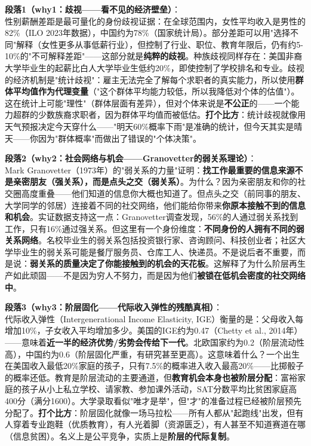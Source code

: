 \documentclass[../main.tex]{subfiles}
\begin{document}
	\textbf{段落1（why1：歧视——看不见的经济壁垒）}：\\
	性别薪酬差距是最可量化的身份歧视证据：在全球范围内，女性平均收入是男性的82\%（ILO 2023年数据），中国约为78\%（国家统计局）。部分差距可以用"选择不同"解释（女性更多从事低薪行业），但控制了行业、职位、教育年限后，仍有约5-10\%的"不可解释差距"——这部分就是\textbf{纯粹的歧视}。种族歧视同样存在：美国非裔大学毕业生的起薪比白人大学毕业生低约20\%，即使控制了学校排名和专业。歧视的经济机制是"统计歧视"：雇主无法完全了解每个求职者的真实能力，所以使用\textbf{群体平均值作为代理变量}（"这个群体平均能力较低，所以我降低对个体的估值"）。这在统计上可能"理性"（群体层面有差异），但对个体来说是\textbf{不公正}的——一个能力超群的少数族裔求职者，因为群体平均值而被低估。\textbf{打个比方}：统计歧视就像用天气预报决定今天穿什么——"明天60\%概率下雨"是准确的统计，但今天其实是晴天——你因为"群体概率"而做出了错误的"个体决策"。

	\textbf{段落2（why2：社会网络与机会——Granovetter的弱关系理论）}：\\
	Mark Granovetter（1973年）的"弱关系的力量"证明：\textbf{找工作最重要的信息来源不是亲密朋友（强关系），而是点头之交（弱关系）}。为什么？因为亲密朋友和你的社交圈高度重叠——他们知道的信息你大概也知道了。但点头之交（前同事的朋友、大学同学的邻居）连接着不同的社交网络，他们能给你带来\textbf{你原本接触不到的信息和机会}。实证数据支持这一点：Granovetter调查发现，56\%的人通过弱关系找到工作，只有16\%通过强关系。但这里有一个身份维度：\textbf{不同身份的人拥有不同的弱关系网络}。名校毕业生的弱关系包括投资银行家、咨询顾问、科技创业者；社区大学毕业生的弱关系可能是餐厅服务员、仓库工人、快递员。不是说后者不重要，而是说：\textbf{弱关系的质量决定了你能接触到的机会的天花板}。这解释了为什么阶层再生产如此顽固——不是因为穷人不努力，而是因为他们\textbf{被锁在低机会密度的社交网络中}。

	\textbf{段落3（why3：阶层固化——代际收入弹性的残酷真相）}：\\
	代际收入弹性（Intergenerational Income Elasticity, IGE）衡量的是：父母收入每增加10\%，子女收入平均增加多少。美国的IGE约为0.47（Chetty et al., 2014年）——意味着\textbf{近一半的经济优势/劣势会传给下一代}。北欧国家约为0.2（阶层流动性高），中国约为0.6（阶层固化严重，有研究甚至更高）。这意味着什么？一个出生在美国收入最低20\%家庭的孩子，只有7.5\%的概率进入收入最高20\%——比掷骰子的概率还低。教育是阶层流动的主要通道，但\textbf{教育机会本身也被阶层分配}：富裕家庭的孩子从小上私立学校、请家教、参加课外活动，SAT分数平均比贫困家庭高400分（满分1600）。大学录取看似"唯才是举"，但"才"的准备过程已经被阶层预先分配了。\textbf{打个比方}：阶层固化就像一场马拉松——所有人都从"起跑线"出发，但有人穿着专业跑鞋（优质教育），有人光着脚（资源匮乏），有人甚至不知道赛道在哪（信息贫困）。名义上是公平竞争，实质上是\textbf{阶层的代际复制}。
\end{document}

